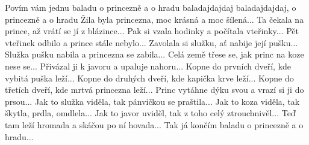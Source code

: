 \ve{}
Povím vám jednu baladu o princezně a o hradu
baladajdajdaj baladajdajdaj, o princezně a o hradu
\ve{}Žila byla princezna, moc krásná a moc šílená...
\ve{}Ta čekala na prince, až vrátí se jí z blázince...
\ve{}Pak si vzala hodinky a počítala vteřinky...
\ve{}Pět vteřinek odbilo a prince stále nebylo...
\ve{}Zavolala si služku, ať nabije její pušku...
\ve{}Služka pušku nabila a princezna se zabila...
\ve{}Celá země třese se, jak princ na koze nese se...
\ve{}Přivázal ji k javoru a upaluje nahoru...
\ve{}Kopne do prvních dveří, kde vybitá puška leží...
\ve{}Kopne do druhých dveří, kde kapička krve leží...
\ve{}Kopne do třetích dveří, kde mrtvá princezna leží...
\ve{}Princ vytáhne dýku svou a vrazí si ji do prsou...
\ve{}Jak to služka viděla, tak pánvičkou se praštila...
\ve{}Jak to koza viděla, tak škytla, prdla, omdlela...
\ve{}Jak to javor uviděl, tak z toho celý ztrouchnivěl...
\ve{}Teď tam leží hromada a skáčou po ní hovada...
\ve{}Tak já končím baladu o princezně a o hradu...
\esong{}